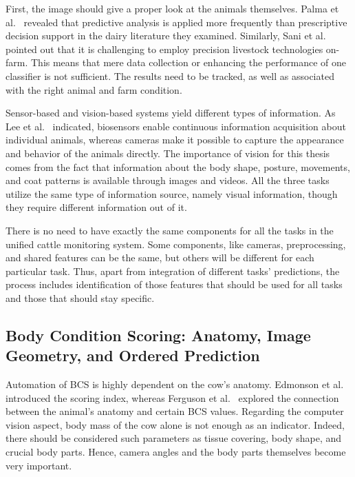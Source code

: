 First, the image should give a proper look at the animals themselves. Palma et al.~\cite{palma2025ani1} revealed that predictive analysis is applied more frequently than prescriptive decision support in the dairy literature they examined. Similarly, Sani et al.~\cite{sani2026ab25} pointed out that it is challenging to employ precision livestock technologies on-farm. This means that mere data collection or enhancing the performance of one classifier is not sufficient. The results need to be tracked, as well as associated with the right animal and farm condition.

Sensor-based and vision-based systems yield different types of information. As Lee et al.~\cite{lee2026ab26} indicated, biosensors enable continuous information acquisition about individual animals, whereas cameras make it possible to capture the appearance and behavior of the animals directly. The importance of vision for this thesis comes from the fact that information about the body shape, posture, movements, and coat patterns is available through images and videos. All the three tasks utilize the same type of information source, namely visual information, though they require different information out of it.

There is no need to have exactly the same components for all the tasks in the unified cattle monitoring system. Some components, like cameras, preprocessing, and shared features can be the same, but others will be different for each particular task. Thus, apart from integration of different tasks' predictions, the process includes identification of those features that should be used for all tasks and those that should stay specific.

\subsection{Body Condition Scoring: Anatomy, Image Geometry, and Ordered Prediction}

Automation of BCS is highly dependent on the cow's anatomy. Edmonson et al.~\cite{edmonson1989bcs} introduced the scoring index, whereas Ferguson et al.~\cite{ferguson1994bcs} explored the connection between the animal's anatomy and certain BCS values. Regarding the computer vision aspect, body mass of the cow alone is not enough as an indicator. Indeed, there should be considered such parameters as tissue covering, body shape, and crucial body parts. Hence, camera angles and the body parts themselves become very important.

